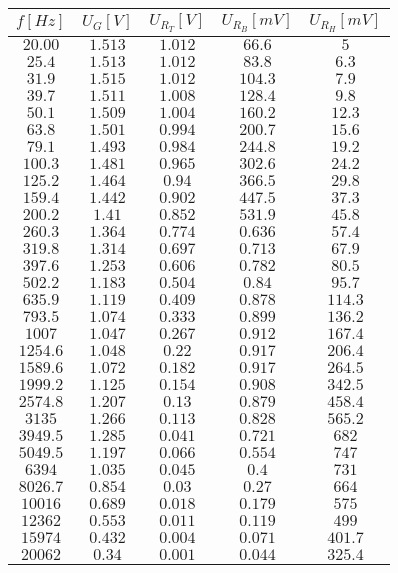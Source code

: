 \begin{tabular}{c|c|c|c|c}
\(f [Hz]\) & \(U_{G} [V]\) & \(U_{R_T} [V]\) & \(U_{R_B} [mV]\) & \(U_{R_H} [mV]\) \\\hline 
\(20.00\) & \(1.513\) & \(1.012\) & \(66.6\) & \(5\) \\ 
\(25.4\) & \(1.513\) & \(1.012\) & \(83.8\) & \(6.3\) \\ 
\(31.9\) & \(1.515\) & \(1.012\) & \(104.3\) & \(7.9\) \\ 
\(39.7\) & \(1.511\) & \(1.008\) & \(128.4\) & \(9.8\) \\ 
\(50.1\) & \(1.509\) & \(1.004\) & \(160.2\) & \(12.3\) \\ 
\(63.8\) & \(1.501\) & \(0.994\) & \(200.7\) & \(15.6\) \\ 
\(79.1\) & \(1.493\) & \(0.984\) & \(244.8\) & \(19.2\) \\ 
\(100.3\) & \(1.481\) & \(0.965\) & \(302.6\) & \(24.2\) \\ 
\(125.2\) & \(1.464\) & \(0.94\) & \(366.5\) & \(29.8\) \\ 
\(159.4\) & \(1.442\) & \(0.902\) & \(447.5\) & \(37.3\) \\ 
\(200.2\) & \(1.41\) & \(0.852\) & \(531.9\) & \(45.8\) \\ 
\(260.3\) & \(1.364\) & \(0.774\) & \(0.636\) & \(57.4\) \\ 
\(319.8\) & \(1.314\) & \(0.697\) & \(0.713\) & \(67.9\) \\ 
\(397.6\) & \(1.253\) & \(0.606\) & \(0.782\) & \(80.5\) \\ 
\(502.2\) & \(1.183\) & \(0.504\) & \(0.84\) & \(95.7\) \\ 
\(635.9\) & \(1.119\) & \(0.409\) & \(0.878\) & \(114.3\) \\ 
\(793.5\) & \(1.074\) & \(0.333\) & \(0.899\) & \(136.2\) \\ 
\(1007\) & \(1.047\) & \(0.267\) & \(0.912\) & \(167.4\) \\ 
\(1254.6\) & \(1.048\) & \(0.22\) & \(0.917\) & \(206.4\) \\ 
\(1589.6\) & \(1.072\) & \(0.182\) & \(0.917\) & \(264.5\) \\ 
\(1999.2\) & \(1.125\) & \(0.154\) & \(0.908\) & \(342.5\) \\ 
\(2574.8\) & \(1.207\) & \(0.13\) & \(0.879\) & \(458.4\) \\ 
\(3135\) & \(1.266\) & \(0.113\) & \(0.828\) & \(565.2\) \\ 
\(3949.5\) & \(1.285\) & \(0.041\) & \(0.721\) & \(682\) \\ 
\(5049.5\) & \(1.197\) & \(0.066\) & \(0.554\) & \(747\) \\ 
\(6394\) & \(1.035\) & \(0.045\) & \(0.4\) & \(731\) \\ 
\(8026.7\) & \(0.854\) & \(0.03\) & \(0.27\) & \(664\) \\ 
\(10016\) & \(0.689\) & \(0.018\) & \(0.179\) & \(575\) \\ 
\(12362\) & \(0.553\) & \(0.011\) & \(0.119\) & \(499\) \\ 
\(15974\) & \(0.432\) & \(0.004\) & \(0.071\) & \(401.7\) \\ 
\(20062\) & \(0.34\) & \(0.001\) & \(0.044\) & \(325.4\)
\end{tabular}

